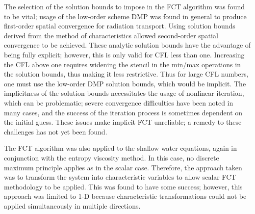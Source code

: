The selection of the solution bounds to impose in the FCT algorithm
was found to be vital; usage of the low-order scheme DMP was found in
general to produce first-order spatial convergence for radiation transport.
Using solution bounds derived from the method of characteristics allowed
second-order spatial convergence to be achieved. These analytic solution
bounds have the advantage of being fully explicit; however, this is only
valid for CFL less than one. Increasing the CFL above one requires widening
the stencil in the min/max operations in the solution bounds, thus making
it less restrictive. Thus for large CFL numbers, one must use the low-order
DMP solution bounds, which would be implicit. The implicitness of the
solution bounds necessitates the usage of nonlinear iteration, which can
be problematic; severe convergence difficulties have been noted in many
cases, and the success of the iteration process is sometimes dependent
on the initial guess. These issues make implicit FCT unreliable; a remedy
to these challenges has not yet been found.

The FCT algorithm was also applied to the shallow water equations,
again in conjunction with the entropy viscosity method. In this case,
no discrete maximum principle applies as in the scalar case. Therefore,
the approach taken was to transform the system into characteristic variables
to allow scalar FCT methodology to be applied. This was found to have some
success; however, this approach was limited to 1-D because characteristic
transformations could not be applied simultaneously in multiple directions.

